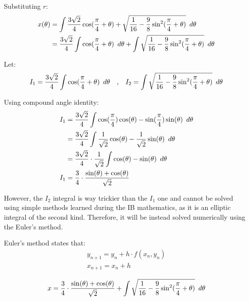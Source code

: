\documentclass[12pt]{article}
\newcommand{\Hquad}{\hspace{0.5em}}
\begin{document}
        Substituting $r$:
        \begin{align}
            x(\theta) &= \int \frac{3\sqrt{2}}{4} \cos (\frac{\pi}{4} + \theta) + \sqrt{\frac{1}{16} - \frac{9}{8} \sin^2 (\frac{\pi}{4}+\theta)} \Hquad d\theta \\
            &= \frac{3\sqrt{2}}{4} \int \cos (\frac{\pi}{4} + \theta) \Hquad d\theta + \int \sqrt{\frac{1}{16} - \frac{9}{8} \sin^2 (\frac{\pi}{4}+\theta)} \Hquad d\theta
        \end{align}

        Let:
        \begin{align*}
            I_1 = \frac{3\sqrt{2}}{4} \int \cos (\frac{\pi}{4} + \theta) \Hquad d\theta \quad \text{,} \quad
            I_2 = \int \sqrt{\frac{1}{16} - \frac{9}{8} \sin^2 (\frac{\pi}{4}+\theta)} \Hquad d\theta
        \end{align*}

        Using compound angle identity:
        \begin{align}
            I_1 &= \frac{3\sqrt{2}}{4} \int \cos (\frac{\pi}{4}) \cos(\theta) - \sin(\frac{\pi}{4}) \sin(\theta) \Hquad d\theta \\
            &= \frac{3\sqrt{2}}{4} \int \frac{1}{\sqrt{2}} \cos(\theta) - \frac{1}{\sqrt{2}} \sin(\theta) \Hquad d\theta \\
            &= \frac{3\sqrt{2}}{4} \cdot \frac{1}{\sqrt{2}} \int \cos(\theta) - \sin(\theta) \Hquad d\theta \\
            I_1 &= \frac{3}{4} \cdot \frac{\sin(\theta) + \cos(\theta)}{\sqrt{2}}
        \end{align}

        However, the $I_2$ integral is way trickier than the $I_1$ one and cannot be solved using simple methods learned during the IB mathematics, as it is an elliptic integral of the second kind\cite{elliptic_integral}. Therefore, it will be instead solved numerically using the Euler's method. 

        Euler's method states that:
        \begin{align*}
            y_{n+1} = y_n + h \cdot f(x_n, y_n) \\
            x_{n+1} = x_n +h
        \end{align*}
 
        \begin{equation}
            x = \frac{3}{4} \cdot \frac{\sin(\theta) + \cos(\theta)}{\sqrt{2}} + \int \sqrt{\frac{1}{16} - \frac{9}{8} \sin^2 (\frac{\pi}{4}+\theta)} \Hquad d\theta
        \end{equation}

    \newpage
    
    

    
    
    
        
\end{document}
